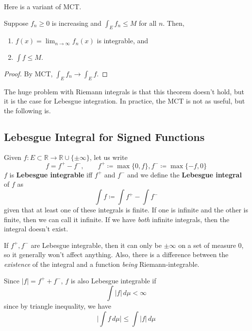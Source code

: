   Here is a variant of MCT. 

  \begin{lemma} 
    Suppose $f_n \geq 0$ is increasing and $\int_E f_n \leq M$ for all $n$. Then, 
    \begin{enumerate}
      \item $f(x) = \lim_{n \to \infty} f_n (x)$ is integrable, and 
      \item $\int f \leq M$. 
    \end{enumerate}
  \end{lemma}
  \begin{proof}
    By MCT, $\int_E f_n \to \int_E f$. 
  \end{proof} 

  The huge problem with Riemann integrals is that this theorem doesn't hold, but it is the case for Lebesgue integration. In practice, the MCT is not as useful, but the following is. 

\subsection{Lebesgue Integral for Signed Functions} 

  \begin{definition}
    Given $f: E \subset \mathbb{R} \to \mathbb{R} \cup \{\pm \infty\}$, let us write 
    \begin{equation}
      f = f^+ - f^-, \qquad f^+ \coloneqq \max \{0, f\}, f^- \coloneqq \max\{-f, 0\}
    \end{equation}
    $f$ is \textbf{Lebesgue integrable} iff $f^+$ and $f^-$ and we define the \textbf{Lebesgue integral} of $f$ as 
    \begin{equation}
      \int f \coloneqq \int f^+ - \int f^- 
    \end{equation}
    given that at least one of these integrals is finite. If one is infinite and the other is finite, then we can call it infinite. If we have \textit{both} infinite integrals, then the integral doesn't exist. 
  \end{definition} 

  If $f^+, f^-$ are Lebesgue integrable, then it can only be $\pm \infty$ on a set of measure $0$, so it generally won't affect anything. Also, there is a difference between the \textit{existence} of the integral and a function \textit{being} Riemann-integrable. 

  Since $|f| = f^+ + f^-$, $f$ is also Lebesgue integrable if 
  \begin{equation}
    \int |f| \, d\mu < \infty 
  \end{equation}
  since by triangle inequality, we have 
  \begin{equation}
    \bigg| \int f \, d\mu \bigg| \leq \int |f| \, d \mu
  \end{equation}

